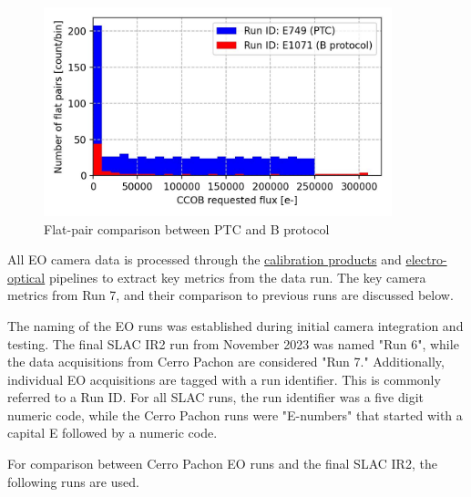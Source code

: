 \begin{figure}
\begin{centering}
\includegraphics[width=0.9\textwidth]{sections/figures/baselineCharacterization/PTC_BProtocol_Comparison.jpg}
	\caption{Flat-pair comparison between PTC and B protocol
\label{fig:PTC_BProtocol_Comparison}}
\end{centering}
\end{figure}


All EO camera data is processed through the
\href{https://github.com/lsst/cp_pipe}{calibration products} and
\href{https://github.com/lsst-camera-dh/eo_pipe/tree/main}{electro-optical}
pipelines to extract key metrics from the data run. The key camera
metrics from Run 7, and their comparison to previous runs are discussed
below.

The naming of the EO runs was established during initial camera
integration and testing. The final SLAC IR2 run from November 2023 was
named "Run 6", while the data acquisitions from Cerro Pachon are
considered "Run 7." Additionally, individual EO acquisitions are tagged
with a run identifier. This is commonly referred to a Run ID. For all
SLAC runs, the run identifier was a five digit numeric code, while the
Cerro Pachon runs were "E-numbers" that started with a capital E
followed by a numeric code.

For comparison between Cerro Pachon EO runs and the final SLAC IR2, the
following runs are used.

